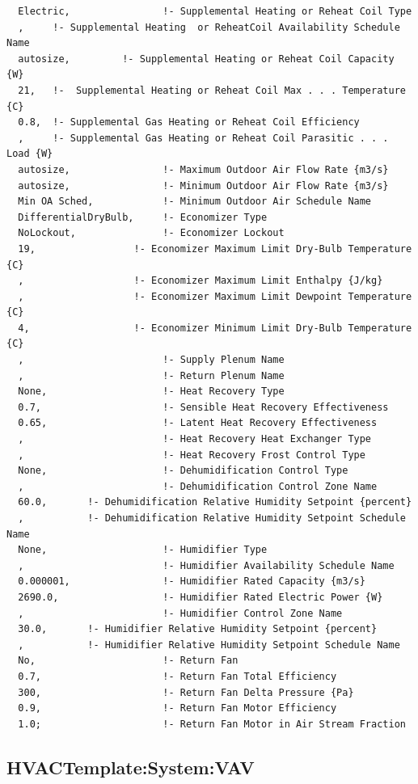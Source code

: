 \begin{lstlisting}
  Electric,                !- Supplemental Heating or Reheat Coil Type
  ,     !- Supplemental Heating  or ReheatCoil Availability Schedule Name
  autosize,         !- Supplemental Heating or Reheat Coil Capacity {W}
  21,   !-  Supplemental Heating or Reheat Coil Max . . . Temperature {C}
  0.8,  !- Supplemental Gas Heating or Reheat Coil Efficiency
  ,     !- Supplemental Gas Heating or Reheat Coil Parasitic . . . Load {W}
  autosize,                !- Maximum Outdoor Air Flow Rate {m3/s}
  autosize,                !- Minimum Outdoor Air Flow Rate {m3/s}
  Min OA Sched,            !- Minimum Outdoor Air Schedule Name
  DifferentialDryBulb,     !- Economizer Type
  NoLockout,               !- Economizer Lockout
  19,                 !- Economizer Maximum Limit Dry-Bulb Temperature {C}
  ,                   !- Economizer Maximum Limit Enthalpy {J/kg}
  ,                   !- Economizer Maximum Limit Dewpoint Temperature {C}
  4,                  !- Economizer Minimum Limit Dry-Bulb Temperature {C}
  ,                        !- Supply Plenum Name
  ,                        !- Return Plenum Name
  None,                    !- Heat Recovery Type
  0.7,                     !- Sensible Heat Recovery Effectiveness
  0.65,                    !- Latent Heat Recovery Effectiveness
  ,                        !- Heat Recovery Heat Exchanger Type
  ,                        !- Heat Recovery Frost Control Type
  None,                    !- Dehumidification Control Type
  ,                        !- Dehumidification Control Zone Name
  60.0,       !- Dehumidification Relative Humidity Setpoint {percent}
  ,           !- Dehumidification Relative Humidity Setpoint Schedule Name
  None,                    !- Humidifier Type
  ,                        !- Humidifier Availability Schedule Name
  0.000001,                !- Humidifier Rated Capacity {m3/s}
  2690.0,                  !- Humidifier Rated Electric Power {W}
  ,                        !- Humidifier Control Zone Name
  30.0,       !- Humidifier Relative Humidity Setpoint {percent}
  ,           !- Humidifier Relative Humidity Setpoint Schedule Name
  No,                      !- Return Fan
  0.7,                     !- Return Fan Total Efficiency
  300,                     !- Return Fan Delta Pressure {Pa}
  0.9,                     !- Return Fan Motor Efficiency
  1.0;                     !- Return Fan Motor in Air Stream Fraction
\end{lstlisting}

\subsection{HVACTemplate:System:VAV}\label{hvactemplatesystemvav}

